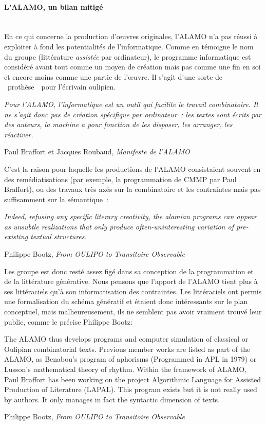 \documentclass{article}
\newcommand{\subsubsubsection}[1]{\paragraph{#1}\mbox{}\\}
\newenvironment{citationbox}
{\begin{center}
		\begin{minipage}{.8\textwidth}
		}
		{
		\end{minipage}	
\end{center}
}
\begin{document}
					
				\subsubsubsection{L'ALAMO, un bilan mitigé}
					En ce qui concerne la production d'œuvres originales, l'ALAMO n'a pas réussi à exploiter à fond les potentialités de l'informatique. Comme en témoigne le nom du groupe (littérature \textit{assistée} par ordinateur), le programme informatique est considéré avant tout comme un moyen de création mais pas comme une fin en soi et encore moins comme une partie de l'œuvre. Il s'agit d'une sorte de \guillemotleft~prothèse~\guillemotright~pour l'écrivain oulipien.
					\begin{citationbox}
						\textit{Pour l’ALAMO, l’informatique est un outil qui facilite le travail combinatoire. Il ne s’agit donc pas de création spécifique par ordinateur~: les textes sont écrits par des auteurs, la machine a pour fonction de les disposer, les arranger, les réactiver.}
						\begin{flushright}
							Paul Braffort et Jacques Roubaud, \textit{Manifeste de l'ALAMO}
						\end{flushright}
					\end{citationbox}
					C'est la raison pour laquelle les productions de l'ALAMO consistaient souvent en des  remédiatisations (par exemple, la programmation de CMMP par Paul Braffort), ou des travaux très axés sur la combinatoire et les contraintes mais pas suffisamment sur la sémantique~:
					\begin{citationbox}
						\textit{Indeed, refusing any specific literary creativity, the alamian programs can appear as unsubtle realizations that only produce often-uninteresting variation of pre-existing textual structures.}
						\begin{flushleft}
							Philippe Bootz, \textit{From OULIPO to Transitoire Observable} \autocite{bootz2012}
						\end{flushleft}
					\end{citationbox}
					Les groupe est donc resté assez figé dans sa conception de la programmation et de la littérature générative. Nous pensons que l'apport de l'ALAMO tient plus à ses littéraciels qu'à son informatisation des contraintes. Les littéraciels ont permis une formalisation du schéma génératif et étaient donc intéressants sur le plan conceptuel, mais malheureusement, ils ne semblent pas avoir vraiment trouvé leur public, comme le précise Philippe Bootz:
					\begin{citationbox}
						The ALAMO thus develops programs and computer simulation of classical or Oulipian combinatorial texts. Previous member works are listed as part of the ALAMO, as Benabou's program of aphorisms (Programmed in APL in 1979) or Lusson's mathematical theory of rhythm. Within the framework of ALAMO, Paul Braffort has been working on the project Algorithmic Language for Assisted Production of Literature (LAPAL). This program exists but it is not really used by authors. It only manages in fact the syntactic dimension of texts.
						\begin{flushright}
							Philippe Bootz, \textit{From OULIPO to Transitoire Observable} \autocite{bootz2012}
						\end{flushright}
					\end{citationbox}
				
\end{document}
